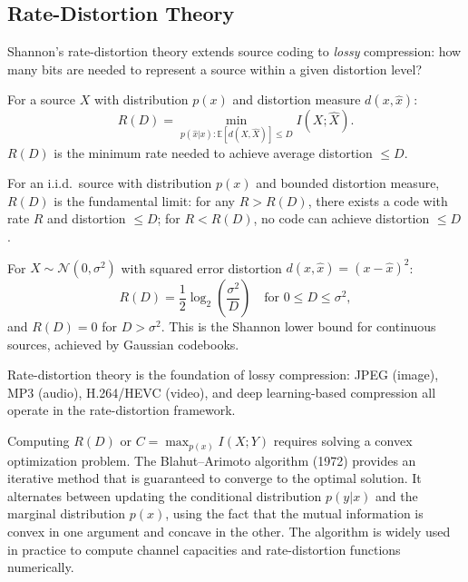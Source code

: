 \subsection{Rate-Distortion Theory}
\label{sec:information:ratedistortion}

Shannon's rate-distortion theory extends source coding to \emph{lossy} compression: how many bits are needed to represent a source within a given distortion level?

\begin{definition}
For a source $X$ with distribution $p(x)$ and distortion measure $d(x,\hat{x})$:
\[
R(D) = \min_{p(\hat{x}|x): \mathbb{E}[d(X,\hat{X})] \le D} I(X;\hat{X}).
\]
$R(D)$ is the minimum rate needed to achieve average distortion $\le D$.
\end{definition}

\begin{theorem}
For an i.i.d.\ source with distribution $p(x)$ and bounded distortion measure, $R(D)$ is the fundamental limit: for any $R > R(D)$, there exists a code with rate $R$ and distortion $\le D$; for $R < R(D)$, no code can achieve distortion $\le D$.
\end{theorem}

\begin{example}
For $X \sim \mathcal{N}(0,\sigma^2)$ with squared error distortion $d(x,\hat{x}) = (x-\hat{x})^2$:
\[
R(D) = \frac{1}{2}\log_2\left(\frac{\sigma^2}{D}\right) \quad \text{for } 0 \le D \le \sigma^2,
\]
and $R(D)=0$ for $D > \sigma^2$. This is the Shannon lower bound for continuous sources, achieved by Gaussian codebooks.
\end{example}

Rate-distortion theory is the foundation of lossy compression: JPEG (image), MP3 (audio), H.264/HEVC (video), and deep learning-based compression all operate in the rate-distortion framework.

Computing $R(D)$ or $C = \max_{p(x)} I(X;Y)$ requires solving a convex optimization problem. The Blahut--Arimoto algorithm (1972) provides an iterative method that is guaranteed to converge to the optimal solution. It alternates between updating the conditional distribution $p(y|x)$ and the marginal distribution $p(x)$, using the fact that the mutual information is convex in one argument and concave in the other. The algorithm is widely used in practice to compute channel capacities and rate-distortion functions numerically.

